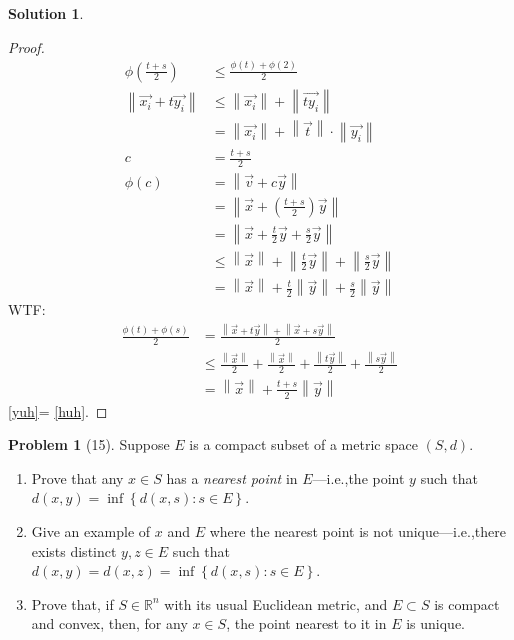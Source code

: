 \documentclass[12pt]{article}
\theoremstyle{definition} %
\newtheorem{solution}{Solution}
\newtheorem{problem}{Problem}
\theoremstyle{plain} %
\begin{document}
\begin{solution}
\begin{proof}
       \begin{align}
    \phi\left( \frac{t+s}{2} \right) &\leq \frac{\phi(t)+\phi(2)}{2}\\[10pt] 
    \left\lVert \vec{x_i}+t \vec{y_i}  \right\rVert &\leq \left\lVert \vec{x_{i}}\right\rVert + \left\lVert \vec{ty_{i}}\right\rVert \\[10pt] 
    &= \left\lVert \vec{x_{i}}\right\rVert + \left\lVert \vec{t}\right\rVert \cdot\left\lVert \vec{y_{i}}\right\rVert \\[10pt] 
    c&= \frac{t+s}{2}\\[10pt] 
    \phi\left( c \right) &= \left\lVert \vec{v} +c \vec{y} \right\rVert \\[10pt] 
    &= \left\lVert \vec{x} + \left( \frac{t+s}{2} \right) \vec{y} \right\rVert \\[10pt] 
    &= \left\lVert \vec{x} +\frac{t}{2}\vec{y} +\frac{s}{2}\vec{y} \right\rVert \\[10pt] 
    &\leq \left\lVert \vec{x} \right\rVert + \left\lVert \frac{t}{2}\vec{y} \right\rVert + \left\lVert \frac{s}{2}\vec{y} \right\rVert \\[10pt] 
    &= \left\lVert \vec{x} \right\rVert + \frac{t}{2}\left\lVert \vec{y} \right\rVert + \frac{s}{2}\left\lVert \vec{y} \right\rVert \label{yuh}
   \end{align} 
   WTF: \begin{align}
    \frac{\phi(t)+\phi(s)}{2}&=\frac{\left\lVert \vec{x} +t\vec{y} \right\rVert + \left\lVert \vec{x} +s \vec{y} \right\rVert}{2} \\[10pt] 
    &\leq \frac{\left\lVert \vec{x} \right\rVert}{2}+\frac{\left\lVert \vec{x} \right\rVert}{2}+\frac{\left\lVert t \vec{y}  \right\rVert}{2} + \frac{\left\lVert s \vec{y}   \right\rVert}{2} \\[10pt] 
    &= \left\lVert \vec{x} \right\rVert + \frac{t+s}{2}\left\lVert \vec{y} \right\rVert \label{huh}
   \end{align}
   \autoref{yuh}= \autoref{huh}.
\end{proof}
\end{solution}
\begin{problem}[15]
   Suppose $E$ is a compact subset of a metric space $(S,d)$. 
   \begin{enumerate}
    \item Prove that any $x\in S$ has a \emph{nearest point} in $E$—i.e.,the point $y$ such that $d(x,y)=\inf \left\{ d(x,s):s\in E \right\} $.
    \item Give an example of $x$ and $E$ where the nearest point is not unique—i.e.,there exists distinct $y,z\in E$ such that $d(x,y)=d(x,z)=\inf \left\{ d(x,s) : s\in E \right\} $.
    \item Prove that, if $S\in \mathbb{{R}}^{n}$ with its usual Euclidean metric, and $E \subset S$ is compact and convex, then, for any $x\in S$, the point nearest to it in $E$ is unique.
   \end{enumerate} 
\end{problem}
\end{document}
